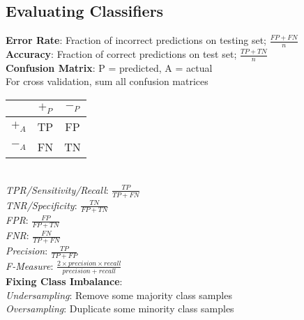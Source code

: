 \documentclass{article}
\begin{document}
\begin{multicols*}{2}
        \subsection*{Evaluating Classifiers}
        \textbf{Error Rate}: Fraction of incorrect predictions on testing set; $\frac{FP + FN}{n}$\\
        \textbf{Accuracy}: Fraction of correct predictions on test set; $\frac{TP + TN}{n}$\\
        \textbf{Confusion Matrix}: P = predicted, A = actual\\
        For cross validation, sum all confusion matrices\\
        \begin{tabular}{c|c|c}
            & $+_P$ & $-_P$ \\
            \hline
            $+_A$ & TP    & FP    \\
            $-_A$ & FN    & TN    \\
        \end{tabular}\\
        \textit{TPR/Sensitivity/Recall}: $\frac{TP}{TP + FN}$\\
        \textit{TNR/Specificity}: $\frac{TN}{FP + TN}$\\
        \textit{FPR}: $\frac{FP}{FP + TN}$\\
        \textit{FNR}: $\frac{FN}{TP + FN}$\\
        \textit{Precision}: $\frac{TP}{TP + FP}$\\
        \textit{F-Measure}: $\frac{2 \times precision \times recall}{precision + recall}$\\
        \textbf{Fixing Class Imbalance}:\\
        \textit{Undersampling}: Remove some majority class samples\\
        \textit{Oversampling}: Duplicate some minority class samples\\

\end{multicols*}
\end{document}
